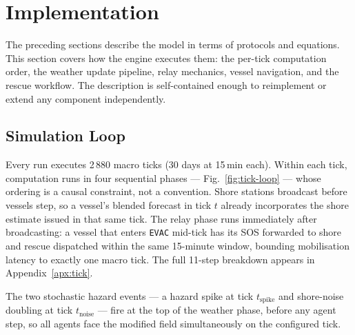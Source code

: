 \documentclass[cameraready]{Interspeech}
\begin{document}
\section{Implementation}
\label{sec:implementation}

The preceding sections describe the model in terms of protocols and equations. This section covers how the engine executes them: the per-tick computation order, the weather update pipeline, relay mechanics, vessel navigation, and the rescue workflow. The description is self-contained enough to reimplement or extend any component independently.

\subsection{Simulation Loop}
\label{sec:loop}

Every run executes 2\,880 macro ticks (30 days at 15\,min each). Within each tick, computation runs in four sequential phases — Fig.~\ref{fig:tick-loop} — whose ordering is a causal constraint, not a convention. Shore stations broadcast before vessels step, so a vessel's blended forecast in tick $t$ already incorporates the shore estimate issued in that same tick. The relay phase runs immediately after broadcasting: a vessel that enters \texttt{EVAC} mid-tick has its SOS forwarded to shore and rescue dispatched within the same 15-minute window, bounding mobilisation latency to exactly one macro tick. The full 11-step breakdown appears in Appendix~\ref{apx:tick}.

The two stochastic hazard events — a hazard spike at tick $t_\text{spike}$ and shore-noise doubling at tick $t_\text{noise}$ — fire at the top of the weather phase, before any agent step, so all agents face the modified field simultaneously on the configured tick.
\end{document}
